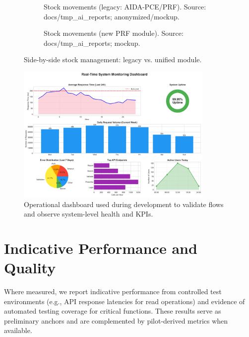 \begin{figure}[htbp]
    \centering
    \begin{subfigure}[t]{0.45\textwidth}
        \centering
        \caption{Stock movements (legacy: AIDA-PCE/PRF). Source: docs/tmp\_ai\_reports; anonymized/mockup.}
        \label{fig:stock_legacy}
    \end{subfigure}
    \begin{subfigure}[t]{0.45\textwidth}
        \centering
        \caption{Stock movements (new PRF module). Source: docs/tmp\_ai\_reports; mockup.}
        \label{fig:stock_new}
    \end{subfigure}
    \caption{Side-by-side stock management: legacy vs. unified module.}
\end{figure}

\begin{figure}[htbp]
    \centering
    \includegraphics[width=0.85\textwidth]{images/generated/monitoring_dashboard.png}
    \caption{Operational dashboard used during development to validate flows and observe system-level health and KPIs.}
    \label{fig:monitoring_dashboard}
\end{figure}

\section{Indicative Performance and Quality}
Where measured, we report indicative performance from controlled test environments (e.g., API response latencies for read operations) and evidence of automated testing coverage for critical functions. These results serve as preliminary anchors and are complemented by pilot-derived metrics when available.

